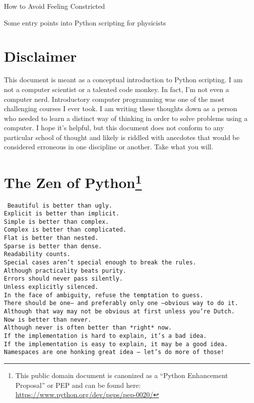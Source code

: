\documentclass[11pt]{article}
\begin{document}
\begin{center}
	\LARGE  How to Avoid Feeling Constricted
	
	\normalsize  Some entry points into Python scripting for physicists \\
\end{center}


\section*{Disclaimer}
This document is meant as a conceptual introduction to Python scripting.  
I am not a computer scientist or a talented code monkey.  
In fact, I'm not even a computer nerd.
Introductory computer programming was one of the most challenging courses I ever took.
I am writing these thoughts down as a person who needed to learn a distinct way of thinking in order to solve problems using a computer.
I hope it's helpful, but this document does not conform to any particular school of thought and likely is riddled with anecdotes that would be considered erroneous in one discipline or another.
Take what you will.

\section[The Zen of Python]{The Zen of Python\footnote{This public domain document is canonized as a ``Python Enhancement Proposal'' or PEP and can be found here: \url{https://www.python.org/dev/peps/pep-0020/}}}

\tt
Beautiful is better than ugly.\\
Explicit is better than implicit.\\
Simple is better than complex.\\
Complex is better than complicated.\\
Flat is better than nested.\\
Sparse is better than dense.\\
Readability counts.\\
Special cases aren't special enough to break the rules.\\
Although practicality beats purity.\\
Errors should never pass silently.\\
Unless explicitly silenced.\\
In the face of ambiguity, refuse the temptation to guess.\\
There should be one-- and preferably only one --obvious way to do it.\\
Although that way may not be obvious at first unless you're Dutch.\\
Now is better than never.\\
Although never is often better than *right* now.\\
If the implementation is hard to explain, it's a bad idea.\\
If the implementation is easy to explain, it may be a good idea.\\
Namespaces are one honking great idea -- let's do more of those!\\
\rm
\end{document}

